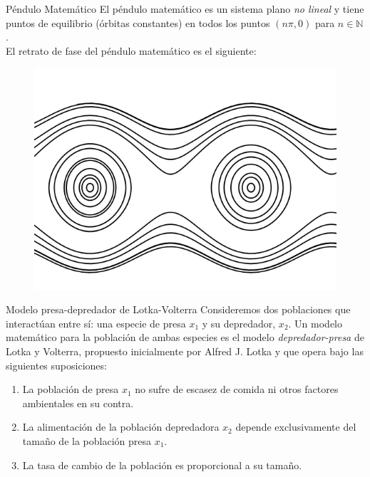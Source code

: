 \documentclass{beamer}
\newcommand{\N}{{\ensuremath{\mathbb{N}}}}
\begin{document}
\begin{frame}{Péndulo Matemático}
El péndulo matemático es un sistema plano \emph{no lineal} y tiene puntos de equilibrio (órbitas constantes) en todos los puntos $(n\pi,0)$ para $n \in \N$. \\
\pause
El retrato de fase del péndulo matemático es el siguiente:
\begin{figure}[!ht] \centering
	\includegraphics[scale=0.4]{../figures/pendulomatematico-fase.png}
\end{figure}
\end{frame}


\begin{frame}{Modelo presa-depredador de Lotka-Volterra}
Consideremos dos poblaciones que interactúan entre sí: una especie de presa $x_1$ y su depredador, $x_2$. Un modelo matemático para la población de ambas especies es el modelo \emph{depredador-presa} de Lotka y Volterra, propuesto inicialmente por Alfred J. Lotka y que opera bajo las siguientes suposiciones:

\begin{enumerate}
	\item La población de presa $x_1$ no sufre de escasez de comida ni otros factores ambientales en su contra.
	\item La alimentación de la población depredadora $x_2$ depende exclusivamente del tamaño de la población presa $x_1$.
	\item La tasa de cambio de la población es proporcional a su tamaño.
\end{enumerate}
\end{frame}
\end{document}
